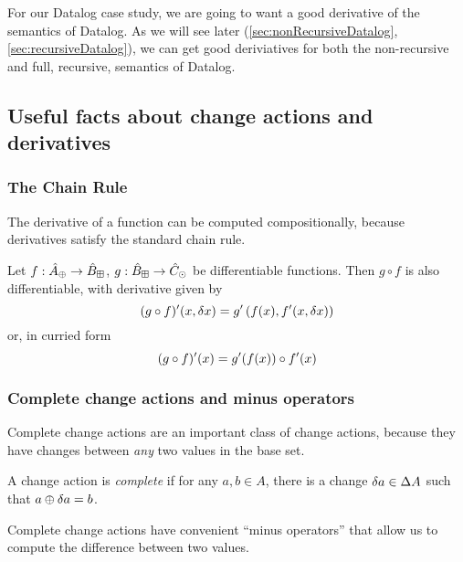 For our Datalog case study, we are going to want a good derivative of the semantics of
Datalog. As we will see later (\cref{sec:nonRecursiveDatalog},
\cref{sec:recursiveDatalog}), we can get good deriviatives for both the
non-recursive and full, recursive, semantics of Datalog.

\subsection{Useful facts about change actions and derivatives}

\subsubsection{The Chain Rule}

The derivative of a function can be computed compositionally, because derivatives satisfy the standard chain rule.

\begin{thm}
  Let $f: \hat{A}_\oplus \rightarrow \hat{B}_\boxplus$, $g: \hat{B}_\boxplus \rightarrow \hat{C}_\odot$ be differentiable functions. Then $g \circ f$ is also
  differentiable, with derivative given by
  \begin{displaymath}
    (g \circ f)'(x, \delta x) = g'\left(f(x), f'(x, \delta x)\right)
  \end{displaymath}
  or, in curried form
  \begin{displaymath}
    (g \circ f)'(x) = g'(f(x)) \circ f'(x)
  \end{displaymath}
\end{thm}

\subsubsection{Complete change actions and minus operators}

Complete change actions are an important class of change actions, because they
have changes between \emph{any} two values in the base set.

\begin{defn}
  A change action is \emph{complete} if for any $a, b \in A$, there is
  a change $\delta a \in \Delta A$ such that $a \oplus \delta a = b$.
\end{defn}

Complete change actions have convenient ``minus operators'' that allow us to
compute the difference between two values.


